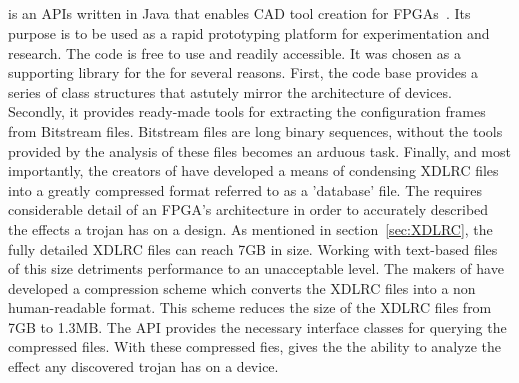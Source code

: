\subsection{\RapidSmith} \label{sec:rapidSmith}
\RapidSmith is an \acrfull{APIs} written in Java that enables \acrfull{CAD} tool creation for \Xilinx \acrshort{FPGA}s~\cite{rapidSmith}.
Its purpose is to be used as a rapid prototyping platform for experimentation and research.
The code is free to use and readily accessible.
It was chosen as a supporting library for the \NameNoPeriod for several reasons.
First, the code base provides a series of class structures that astutely mirror the architecture of \Xilinx devices.
Secondly, it provides ready-made tools for extracting the configuration frames from \gls{Bitstream} files. 
\gls{Bitstream} files are long binary sequences, without the tools provided by \RapidSmith the analysis of these files becomes an arduous task.
Finally, and most importantly, the creators of \RapidSmith have developed a means of condensing XDLRC files into a greatly compressed format referred to as a 'database' file.
The \NameNoPeriod requires considerable detail of an \acrshort{FPGA}'s architecture in order to accurately described the effects a trojan has on a design.
As mentioned in section~\ref{sec:XDLRC}, the fully detailed XDLRC files can reach 7GB in size.
Working with text-based files of this size detriments performance to an unacceptable level.
The makers of \RapidSmith have developed a compression scheme which converts the XDLRC files into a non human-readable format.
This scheme reduces the size of the XDLRC files from 7GB to 1.3MB. 
The \acrshort{API} provides the necessary interface classes for querying the compressed files.
With these compressed fies, \RapidSmith gives the \NameNoPeriod the ability to analyze the effect any discovered trojan has on a device.
